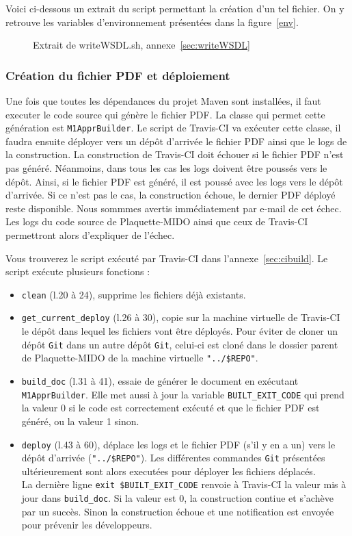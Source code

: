 Voici ci-dessous un extrait du script permettant la création d'un tel fichier. On y retrouve les variables d'environnement présentées dans la figure~\ref{env}.

\begin{figure}[!ht]
    
    \caption*{Extrait de writeWSDL.sh, annexe~\ref{sec:writeWSDL} }
\end{figure}

\subsubsection*{Création du fichier PDF et déploiement}
Une fois que toutes les dépendances du projet Maven sont installées, il faut executer le code source qui génère le fichier PDF. La classe qui permet cette génération est \texttt{M1ApprBuilder}. Le script de Travis-CI va exécuter cette classe, il faudra ensuite déployer vers un dépôt d'arrivée le fichier PDF ainsi que le logs de la construction. La construction de Travis-CI doit échouer si le fichier PDF n'est pas généré. Néanmoins, dans tous les cas les logs doivent être poussés vers le dépôt. Ainsi, si le fichier PDF est généré, il est poussé avec les logs vers le dépôt d'arrivée. Si ce n'est pas le cas, la construction échoue, le dernier PDF déployé reste disponible. Nous sommmes avertis immédiatement par e-mail de cet échec. Les logs du code source de Plaquette-MIDO ainsi que ceux de Travis-CI permettront alors d'expliquer de l'échec.

Vous trouverez le script exécuté par Travis-CI dans l'annexe~\ref{sec:cibuild}. Le script exécute plusieurs fonctions :

\begin{itemize}
    \item \texttt{clean} (l.20 à 24), supprime les fichiers déjà existants.
    \item \texttt{get\_current\_deploy} (l.26 à 30), copie sur la machine virtuelle de Travis-CI le dépôt dans lequel les fichiers vont être déployés. Pour éviter de cloner un dépôt \texttt{Git} dans un autre dépôt \texttt{Git}, celui-ci est cloné dans le dossier parent de Plaquette-MIDO de la machine virtuelle \texttt{"../\${REPO}"}.
    \item \texttt{build\_doc} (l.31 à 41), essaie de générer le document en exécutant \texttt{M1ApprBuilder}. Elle met aussi à jour la variable \texttt{BUILT\_EXIT\_CODE} qui prend la valeur 0 si le code est correctement exécuté et que le fichier PDF est généré, ou la valeur 1 sinon.
    \item \texttt{deploy} (l.43 à 60), déplace les logs et le fichier PDF (s'il y en a un) vers le dépôt d'arrivée (\texttt{"../\${REPO}"}). Les différentes commandes \texttt{Git} présentées ultérieurement sont alors executées pour déployer les fichiers déplacés.\\ La dernière ligne \texttt{exit \${BUILT\_EXIT\_CODE}} renvoie à Travis-CI la valeur mis à jour dans \texttt{build\_doc}. Si la valeur est 0, la construction contiue et s'achève par un succès. Sinon la construction échoue et une notification est envoyée pour prévenir les développeurs.
\end{itemize}


